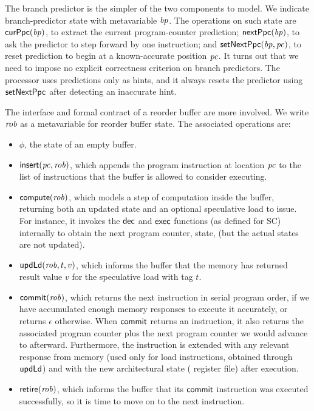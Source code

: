 The branch predictor is the simpler of the two components to model.
We indicate branch-predictor state with metavariable $\mathit{bp}$.
The operations on such state are $\mathsf{curPpc}(\mathit{bp})$, to extract the
current program-counter prediction; $\mathsf{nextPpc}(\mathit{bp})$, to ask the
predictor to step forward by one instruction; and $\mathsf{setNextPpc}(\mathit{bp}, \mathit{pc})$,
to reset prediction to begin at a known-accurate position $\mathit{pc}$.  It
turns out that we need to impose no explicit correctness criterion on
branch predictors.  The processor uses predictions only as hints, and
it always resets the predictor using $\mathsf{setNextPpc}$ after detecting an
inaccurate hint.

The interface and formal contract of a reorder buffer are more
involved.  We write $\mathit{rob}$ as a metavariable for reorder buffer
state.  The associated operations are:
\begin{itemize}
\item $\phi$, the state of an empty buffer.
\item $\mathsf{insert}(\mathit{pc}, \mathit{rob})$, which appends the program instruction at location $\mathit{pc}$ to the list of instructions that the buffer is allowed to consider executing.
\item $\mathsf{compute}(\mathit{rob})$, which models a
step of computation inside the buffer, returning both an updated state
and an optional speculative load to issue. For instance, it invokes the $\mathsf{dec}$
and $\mathsf{exec}$ functions (as defined for SC) internally to obtain the next program
counter, state, \etc{} (but the actual states are not updated).
\item $\mathsf{upd}\mathsf{Ld}(\mathit{rob},t,v)$, which informs the buffer that the memory
has returned result value $v$ for the speculative load with tag $t$.
\item $\mathsf{commit}(\mathit{rob})$, which returns the next instruction in serial
program order, if we have accumulated enough memory responses to execute it
accurately, or returns
$\epsilon$ otherwise.  When $\mathsf{commit}$ returns an instruction, it also
returns the associated program counter plus the next program counter
we would advance to afterward.
 Furthermore, the instruction is
extended with any relevant response from memory (used only for load
instructions, obtained through $\mathsf{upd}\mathsf{Ld}$) and with the new architectural state (\eg{} register
file) after execution.
\item $\mathsf{retire}(\mathit{rob})$, which informs the buffer that its $\mathsf{commit}$
instruction was executed successfully, so it is time to move on to the
next instruction.
\end{itemize}

